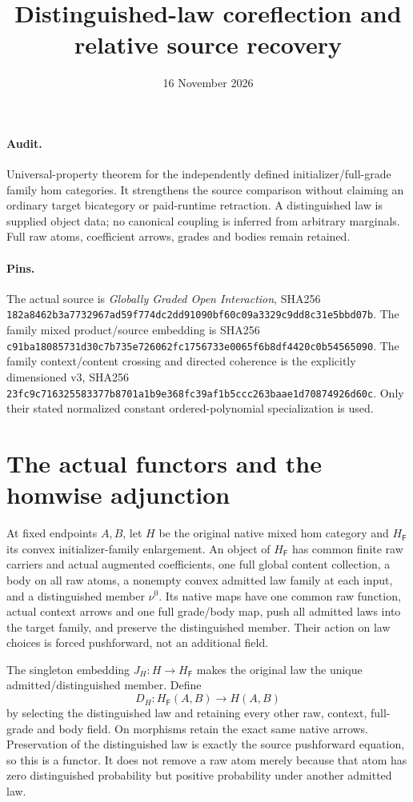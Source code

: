 \documentclass[11pt]{article}
\title{Distinguished-law coreflection and relative source recovery}
\date{16 November 2026}
\begin{document}
\maketitle
\paragraph{Audit.} Universal-property theorem for the independently defined initializer/full-grade family hom categories. It strengthens the source comparison without claiming an ordinary target bicategory or paid-runtime retraction. A distinguished law is supplied object data; no canonical coupling is inferred from arbitrary marginals. Full raw atoms, coefficient arrows, grades and bodies remain retained.

\paragraph{Pins.} The actual source is \emph{Globally Graded Open Interaction}, SHA256 \texttt{182a8462b3a7732967ad59f774dc2dd91090bf60c09a3329c9dd8c31e5bbd07b}. The family mixed product/source embedding is SHA256 \texttt{c91ba18085731d30c7b735e726062fc1756733e0065f6b8df4420c0b54565090}. The family context/content crossing and directed coherence is the explicitly dimensioned v3, SHA256 \texttt{23fc9c716325583377b8701a1b9e368fc39af1b5ccc263baae1d70874926d60c}. Only their stated normalized constant ordered-polynomial specialization is used.

\section{The actual functors and the homwise adjunction}
At fixed endpoints $A,B$, let $H$ be the original native mixed hom category and $H_{\mathsf F}$ its convex initializer-family enlargement. An object of $H_{\mathsf F}$ has common finite raw carriers and actual augmented coefficients, one full global content collection, a body on all raw atoms, a nonempty convex admitted law family at each input, and a distinguished member $\nu^0$. Its native maps have one common raw function, actual context arrows and one full grade/body map, push all admitted laws into the target family, and preserve the distinguished member. Their action on law choices is forced pushforward, not an additional field.

The singleton embedding $J_H:H\to H_{\mathsf F}$ makes the original law the unique admitted/distinguished member. Define
\[
 D_H:H_{\mathsf F}(A,B)\longrightarrow H(A,B)
\]
by selecting the distinguished law and retaining every other raw, context, full-grade and body field. On morphisms retain the exact same native arrows. Preservation of the distinguished law is exactly the source pushforward equation, so this is a functor. It does not remove a raw atom merely because that atom has zero distinguished probability but positive probability under another admitted law.
\end{document}
